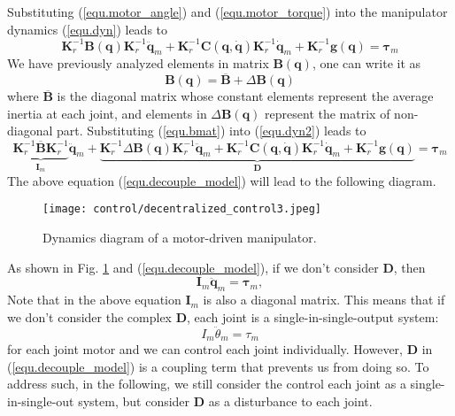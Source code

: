 \documentclass[10pt]{article}
\begin{document}
Substituting (\ref{equ.motor_angle})  and (\ref{equ.motor_torque}) into the manipulator dynamics (\ref{equ.dyn}) leads to
\begin{equation}\label{equ.dyn2}
    \boldsymbol{K}_{r}^{-1} \boldsymbol{B}(\boldsymbol{q}) \boldsymbol{K}_{r}^{-1} \ddot{\boldsymbol{q}}_{m}+\boldsymbol{K}_{r}^{-1} \boldsymbol{C}(\boldsymbol{q}, \dot{\boldsymbol{q}}) \boldsymbol{K}_{r}^{-1} \dot{\boldsymbol{q}}_{m}+\boldsymbol{K}_{r}^{-1} \boldsymbol{g}(\boldsymbol{q})=\boldsymbol{\tau}_{m}
\end{equation}
We have previously analyzed elements in matrix $\boldsymbol{B}(\boldsymbol{q})$, one can write it as
\begin{equation}\label{equ.bmat}
    \boldsymbol{B}(\boldsymbol{q})=\overline{\boldsymbol{B}}+\Delta \boldsymbol{B}(\boldsymbol{q})
\end{equation}
where $\overline{\boldsymbol{B}}$ is the diagonal matrix whose constant elements represent the average inertia at each joint, and elements in $\Delta \boldsymbol{B}(\boldsymbol{q})$ represent the matrix of  non-diagonal  part. Substituting (\ref{equ.bmat}) into (\ref{equ.dyn2}) leads to
\begin{equation}\label{equ.decouple_model}
    \underbrace{\boldsymbol{K}_{r}^{-1} \overline{\boldsymbol{B}} \boldsymbol{K}_{r}^{-1}}_{\boldsymbol{I}_m} \ddot{\boldsymbol{q}}_{m}+\underbrace{\boldsymbol{K}_{r}^{-1} \Delta \boldsymbol{B}(\boldsymbol{q}) \boldsymbol{K}_{r}^{-1} \ddot{\boldsymbol{q}}_{m}+\boldsymbol{K}_{r}^{-1} \boldsymbol{C}(\boldsymbol{q}, \dot{\boldsymbol{q}}) \boldsymbol{K}_{r}^{-1} \dot{\boldsymbol{q}}_{m}+\boldsymbol{K}_{r}^{-1} \boldsymbol{g}(\boldsymbol{q})}_{\boldsymbol{D}}=\boldsymbol{\tau}_{m}
\end{equation}
The above equation (\ref{equ.decouple_model}) will lead to the following diagram. 

\begin{figure}[H]
    \centering
    \texttt{[image: control/decentralized\_control3.jpeg]}
    \caption{Dynamics diagram of a motor-driven manipulator.}
    \label{fig:3}
\end{figure}

As shown in Fig. \ref{fig:3} and (\ref{equ.decouple_model}), if we don't consider $\boldsymbol{D}$, then 
$$
\boldsymbol{I}_m\boldsymbol{\ddot{q}}_m=\boldsymbol{\tau}_m,
$$
Note that in the above equation $\boldsymbol{I}_m$ is also a diagonal matrix. This means that if we don't consider the complex $\boldsymbol{D}$, each joint is a single-in-single-output system:
\begin{equation}\label{equ.single_joint_dyn}
    {I}_m{\ddot{\theta}_m}=\tau_m
\end{equation}
for each joint motor and we can control each joint individually. However, $\boldsymbol{D}$ in (\ref{equ.decouple_model}) is a coupling term that prevents us from doing so. To address such, in the following, we still consider the control each joint as a single-in-single-out system, but consider $\boldsymbol{D}$ as a disturbance to each joint.
\end{document}

